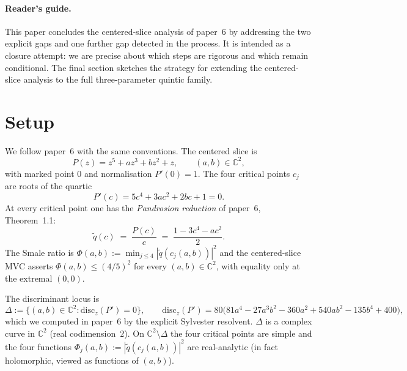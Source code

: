\documentclass[11pt,a4paper]{article}
\begin{document}
\paragraph{Reader's guide.}
This paper concludes the centered-slice analysis of paper~6 by
addressing the two explicit gaps and one further gap detected in the
process. It is intended as a closure attempt: we are precise about
which steps are rigorous and which remain conditional. The final
section sketches the strategy for extending the centered-slice
analysis to the full three-parameter quintic family.

\tableofcontents

\section{Setup}

We follow paper~6 with the same conventions. The centered slice is
\begin{equation}
P(z) = z^5 + a z^3 + b z^2 + z, \qquad (a,b)\in\mathbb{C}^2,
\end{equation}
with marked point $0$ and normalisation $P'(0)=1$. The four critical
points $c_j$ are roots of the quartic
\begin{equation}
P'(c) = 5 c^4 + 3 a c^2 + 2 b c + 1 = 0.
\label{eq:critical}
\end{equation}
At every critical point one has the \emph{Pandrosion reduction} of
paper~6, Theorem~1.1:
\begin{equation}
\widetilde q(c) \;=\; \frac{P(c)}{c} \;=\; \frac{1-3c^4-ac^2}{2}.
\label{eq:qtil}
\end{equation}
The Smale ratio is $\Phi(a,b) := \min_{j\le 4} |\widetilde q(c_j(a,b))|^2$
and the centered-slice MVC asserts $\Phi(a,b)\le (4/5)^2$ for every
$(a,b)\in\mathbb{C}^2$, with equality only at the extremal $(0,0)$.

The discriminant locus is
\begin{equation}
\Delta := \{(a,b)\in\mathbb{C}^2 : \mathrm{disc}_z(P')=0\},
\qquad
\mathrm{disc}_z(P') = 80\bigl(81 a^4 - 27 a^3 b^2 - 360 a^2 + 540 a b^2 - 135 b^4 + 400\bigr),
\label{eq:disc}
\end{equation}
which we computed in paper~6 by the explicit Sylvester resolvent.
$\Delta$ is a complex curve in $\mathbb{C}^2$ (real codimension~$2$).
On $\mathbb{C}^2\setminus\Delta$ the four critical points are simple
and the four functions $\Phi_j(a,b):=|\widetilde q(c_j(a,b))|^2$ are
real-analytic (in fact holomorphic, viewed as functions of $(a,b)$).
\end{document}
